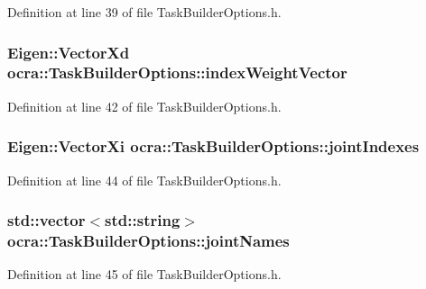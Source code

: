 Definition at line 39 of file Task\+Builder\+Options.\+h.

\subsubsection[{\texorpdfstring{index\+Weight\+Vector}{indexWeightVector}}]{\setlength{\rightskip}{0pt plus 5cm}Eigen\+::\+Vector\+Xd ocra\+::\+Task\+Builder\+Options\+::index\+Weight\+Vector}\hypertarget{classocra_1_1TaskBuilderOptions_a04ebfb8955859ffc40087d3e7b53e0d2}{}\label{classocra_1_1TaskBuilderOptions_a04ebfb8955859ffc40087d3e7b53e0d2}


Definition at line 42 of file Task\+Builder\+Options.\+h.

\subsubsection[{\texorpdfstring{joint\+Indexes}{jointIndexes}}]{\setlength{\rightskip}{0pt plus 5cm}Eigen\+::\+Vector\+Xi ocra\+::\+Task\+Builder\+Options\+::joint\+Indexes}\hypertarget{classocra_1_1TaskBuilderOptions_ad5c32b5777c20dc348b80959574d4a37}{}\label{classocra_1_1TaskBuilderOptions_ad5c32b5777c20dc348b80959574d4a37}


Definition at line 44 of file Task\+Builder\+Options.\+h.

\subsubsection[{\texorpdfstring{joint\+Names}{jointNames}}]{\setlength{\rightskip}{0pt plus 5cm}std\+::vector$<$std\+::string$>$ ocra\+::\+Task\+Builder\+Options\+::joint\+Names}\hypertarget{classocra_1_1TaskBuilderOptions_ab72b4855028ef6965107294b16818ad2}{}\label{classocra_1_1TaskBuilderOptions_ab72b4855028ef6965107294b16818ad2}


Definition at line 45 of file Task\+Builder\+Options.\+h.


